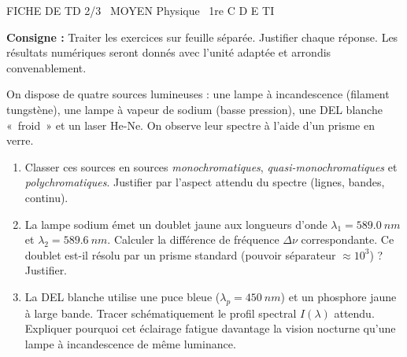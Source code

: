 \documentclass[11pt]{article}
\begin{document}
\begin{tcolorbox}[enhanced,colback=popink,colframe=popink,arc=10pt,boxrule=0pt,left=12pt,right=12pt,top=9pt,bottom=9pt]
{\color{white}\popxbold\small FICHE DE TD 2/3 \textbullet\ MOYEN \hfill Physique \textbullet\ 1re C D E TI\par}
\end{tcolorbox}
\vspace{4pt}
\noindent \textbf{Consigne :} Traiter les exercices sur feuille séparée. Justifier chaque réponse. Les résultats numériques seront donnés avec l'unité adaptée et arrondis convenablement.

\begin{exercice}
On dispose de quatre sources lumineuses : une lampe à incandescence (filament tungstène), une lampe à vapeur de sodium (basse pression), une DEL blanche «~froid~» et un laser He-Ne. On observe leur spectre à l'aide d'un prisme en verre.
\begin{enumerate}
    \item Classer ces sources en sources \textit{monochromatiques}, \textit{quasi-monochromatiques} et \textit{polychromatiques}. Justifier par l'aspect attendu du spectre (lignes, bandes, continu).
    \item La lampe sodium émet un doublet jaune aux longueurs d'onde $\lambda_1 = \SI{589,0}{nm}$ et $\lambda_2 = \SI{589,6}{nm}$. Calculer la différence de fréquence $\Delta \nu$ correspondante. Ce doublet est-il résolu par un prisme standard (pouvoir séparateur $\approx 10^3$) ? Justifier.
    \item La DEL blanche utilise une puce bleue ($\lambda_p = \SI{450}{nm}$) et un phosphore jaune à large bande. Tracer schématiquement le profil spectral $I(\lambda)$ attendu. Expliquer pourquoi cet éclairage fatigue davantage la vision nocturne qu'une lampe à incandescence de même luminance.
\end{enumerate}
\end{exercice}
\end{document}
